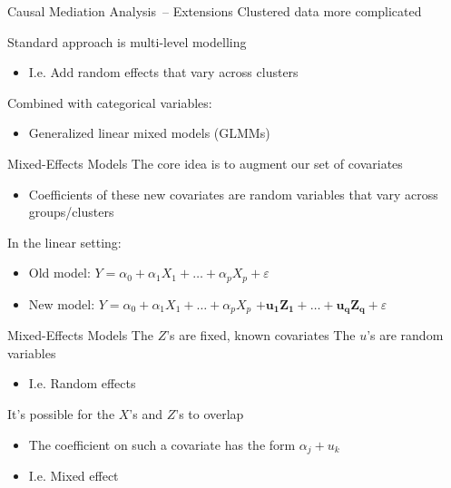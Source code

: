 \documentclass[14pt]{beamer}
\newcommand{\CMA}{Causal Mediation Analysis}
\newcommand{\GLMMs}{Mixed-Effects Models}
\begin{document}
\begin{frame}{\CMA\ -- Extensions}
    Clustered data more complicated \newline

    Standard approach is multi-level modelling
    \begin{itemize}
        \item I.e. Add random effects that vary across clusters \newline
    \end{itemize}

    Combined with categorical variables: 
    \begin{itemize}
        \item Generalized linear mixed models (GLMMs)
    \end{itemize}
\end{frame}


\begin{frame}{\GLMMs}
    The core idea is to augment our set of covariates
    \begin{itemize}
        \item Coefficients of these new covariates are random variables that vary across groups/clusters \newline
    \end{itemize}

    In the linear setting:
    \begin{itemize}
        \item Old model: \newline
        $Y = \alpha_0 + \alpha_1 X_1 + \ldots + \alpha_p X_p + \varepsilon$
        \item New model:  \newline
        $Y = \alpha_0 + \alpha_1 X_1 + \ldots + \alpha_p X_p$ \newline
        \hspace{1cm} $\mathbf{+ u_1 Z_1 + \ldots + u_q Z_q} + \varepsilon$ 
    \end{itemize}

    


\end{frame}

\begin{frame}{\GLMMs}
    The $Z$'s are fixed, known covariates
    The $u$'s are random variables
    \begin{itemize}
        \item I.e. Random effects \newline
    \end{itemize}

    It's possible for the $X$'s and $Z$'s to overlap
    \begin{itemize}
        \item The coefficient on such a covariate has the form $\alpha_j + u_{k}$
        \item I.e. Mixed effect
    \end{itemize}

\end{frame}
\end{document}
